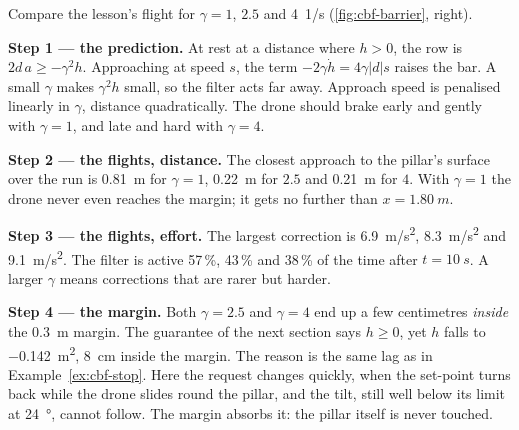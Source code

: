\begin{example}
\label{ex:cbf-gamma}
Compare the lesson's flight for $\gamma = 1$, $2.5$ and \SI{4}{1/s} (\cref{fig:cbf-barrier}, right).

\textbf{Step 1 — the prediction.} At rest at a distance where $h > 0$, the row is $2d\,a \ge -\gamma^2 h$. Approaching at speed $s$, the term $-2\gamma\dot h = 4\gamma|d|s$ raises the bar. A small $\gamma$ makes $\gamma^2 h$ small, so the filter acts far away. Approach speed is penalised linearly in $\gamma$, distance quadratically. The drone should brake early and gently with $\gamma = 1$, and late and hard with $\gamma = 4$.

\textbf{Step 2 — the flights, distance.} The closest approach to the pillar's surface over the run is \SI{0.81}{m} for $\gamma = 1$, \SI{0.22}{m} for $2.5$ and \SI{0.21}{m} for $4$. With $\gamma = 1$ the drone never even reaches the margin; it gets no further than $x = \SI{1.80}{m}$.

\textbf{Step 3 — the flights, effort.} The largest correction is \SI{6.9}{m/s^2}, \SI{8.3}{m/s^2} and \SI{9.1}{m/s^2}. The filter is active 57\,\%, 43\,\% and 38\,\% of the time after $t = \SI{10}{s}$. A larger $\gamma$ means corrections that are rarer but harder.

\textbf{Step 4 — the margin.} Both $\gamma = 2.5$ and $\gamma = 4$ end up a few centimetres \emph{inside} the \SI{0.3}{m} margin. The guarantee of the next section says $h \ge 0$, yet $h$ falls to \SI{-0.142}{m^2}, \SI{8}{cm} inside the margin. The reason is the same lag as in Example~\ref{ex:cbf-stop}. Here the request changes quickly, when the set-point turns back while the drone slides round the pillar, and the tilt, still well below its limit at \SI{24}{\degree}, cannot follow. The margin absorbs it: the pillar itself is never touched.
\end{example}


